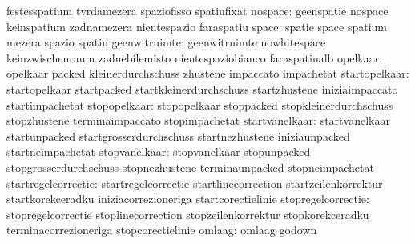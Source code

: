                                   festesspatium                    tvrdamezera
                                  spaziofisso                      spatiufixat
                         nospace: geenspatie                       nospace
                                  keinspatium                      zadnamezera
                                  nientespazio                     faraspatiu
                           space: spatie                           space
                                  spatium                          mezera
                                  spazio                           spatiu
                   geenwitruimte: geenwitruimte                    nowhitespace
                                  keinzwischenraum                 zadnebilemisto
                                  nientespaziobianco               faraspatiualb
                        opelkaar: opelkaar                         packed
                                  kleinerdurchschuss               zhustene
                                  impaccato                        impachetat
                   startopelkaar: startopelkaar                    startpacked
                                  startkleinerdurchschuss          startzhustene
                                  iniziaimpaccato                  startimpachetat
                    stopopelkaar: stopopelkaar                     stoppacked
                                  stopkleinerdurchschuss           stopzhustene
                                  terminaimpaccato                 stopimpachetat
                  startvanelkaar: startvanelkaar                   startunpacked
                                  startgrosserdurchschuss          startnezhustene
                                  iniziaunpacked                   startneimpachetat
                   stopvanelkaar: stopvanelkaar                    stopunpacked
                                  stopgrosserdurchschuss           stopnezhustene
                                  terminaunpacked                  stopneimpachetat
             startregelcorrectie: startregelcorrectie              startlinecorrection
                                  startzeilenkorrektur             startkorekceradku
                                  iniziacorrezioneriga             startcorectielinie
              stopregelcorrectie: stopregelcorrectie               stoplinecorrection
                                  stopzeilenkorrektur              stopkorekceradku
                                  terminacorrezioneriga            stopcorectielinie
                          omlaag: omlaag                           godown

